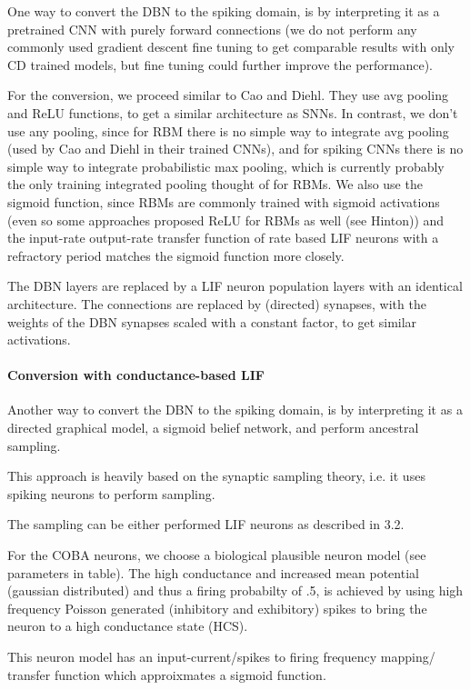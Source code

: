 One way to convert the DBN to the spiking domain, is by interpreting it as a pretrained CNN with purely forward connections (we do not perform any commonly used gradient descent fine tuning to get comparable results with only CD trained models, but fine tuning could further improve the performance).

For the conversion, we proceed similar to Cao and Diehl.
They use avg pooling and ReLU functions, to get a similar architecture as SNNs.
In contrast, we don't use any pooling, since for RBM there is no simple way to integrate avg pooling (used by Cao and Diehl in their trained CNNs), and for spiking CNNs there is no simple way to integrate probabilistic max pooling, which is currently probably the only training integrated pooling thought of for RBMs.
We also use the sigmoid function, since RBMs are commonly trained with sigmoid activations (even so some approaches proposed ReLU for RBMs as well (see Hinton)) and the input-rate output-rate transfer function of rate based LIF neurons with a refractory period matches the sigmoid function more closely.

The DBN layers are replaced by a LIF neuron population layers with an identical architecture. 
The connections are replaced by (directed) synapses, with the weights of the DBN synapses scaled with a constant factor, to get similar activations.
 

\paragraph{Conversion with conductance-based LIF}

Another way to convert the DBN to the spiking domain, is by interpreting it as a directed graphical model, a sigmoid belief network, and perform ancestral sampling.

This approach is heavily based on the synaptic sampling theory, i.e. it uses spiking neurons to perform sampling.

The sampling can be either performed LIF neurons as described in 3.2.

For the COBA neurons, we choose a biological plausible neuron model (see parameters in table). 
The high conductance and increased mean potential (gaussian distributed) and thus a firing probabilty of .5, is achieved by using high frequency Poisson generated (inhibitory and exhibitory) spikes to bring the neuron to a high conductance state (HCS). 

This neuron model has an input-current/spikes to firing frequency mapping/ transfer function which approixmates a sigmoid function.


